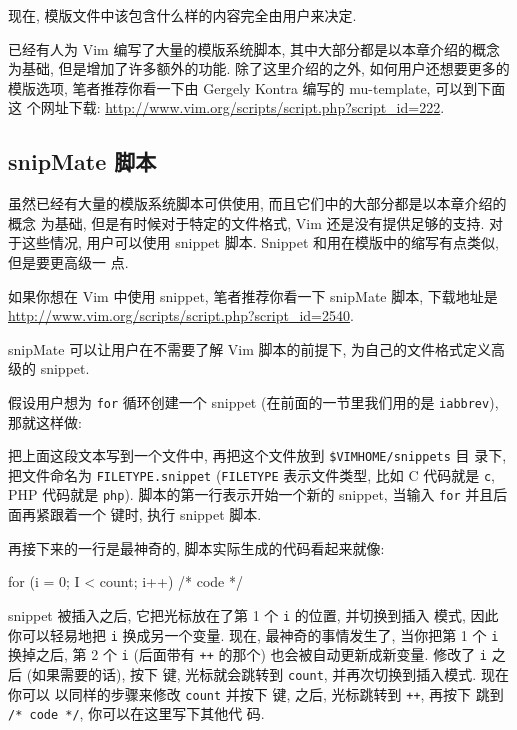 现在, 模版文件中该包含什么样的内容完全由用户来决定.

\begin{warning}
    已经有人为 Vim 编写了大量的模版系统脚本, 其中大部分都是以本章介绍的概念为基础,
    但是增加了许多额外的功能. 除了这里介绍的之外, 如何用户还想要更多的模版选项,
    笔者推荐你看一下由 Gergely Kontra 编写的 mu-template, 可以到下面这
    个网址下载: \url{http://www.vim.org/scripts/script.php?script_id=222}.
\end{warning}

\subsection{snipMate 脚本}
\label{subsec:snippets_with_the_snipmate_script}

虽然已经有大量的模版系统脚本可供使用, 而且它们中的大部分都是以本章介绍的概念
为基础, 但是有时候对于特定的文件格式, Vim 还是没有提供足够的支持. 对于这些情况,
用户可以使用 snippet 脚本. Snippet 和用在模版中的缩写有点类似, 但是要更高级一
点.

如果你想在 Vim 中使用 snippet, 笔者推荐你看一下 snipMate 脚本, 下载地址是
\url{http://www.vim.org/scripts/script.php?script_id=2540}.

snipMate 可以让用户在不需要了解 Vim 脚本的前提下, 为自己的文件格式定义高级的
snippet.

假设用户想为 \texttt{for} 循环创建一个 snippet (在前面的一节里我们用的是 
\texttt{iabbrev}),  那就这样做:
把上面这段文本写到一个文件中, 再把这个文件放到 \texttt{\$VIMHOME/snippets} 目
录下, 把文件命名为 \texttt{FILETYPE.snippet} (\texttt{FILETYPE} 表示文件类型,
比如 C 代码就是 \texttt{c}, PHP 代码就是 \texttt{php}).
脚本的第一行表示开始一个新的 snippet, 当输入 \texttt{for} 并且后面再紧跟着一个
 键时, 执行 snippet 脚本.

再接下来的一行是最神奇的, 脚本实际生成的代码看起来就像:
\begin{vimcode}
    for (i = 0; I < count; i++) {
        /* code */
    }
\end{vimcode}

snippet 被插入之后, 它把光标放在了第 1 个 \texttt{i} 的位置, 并切换到插入
模式, 因此你可以轻易地把 \texttt{i} 换成另一个变量. 现在, 最神奇的事情发生了,
当你把第 1 个 \texttt{i} 换掉之后, 第 2 个 \texttt{i} (后面带有 \texttt{++}
的那个) 也会被自动更新成新变量. 修改了 \texttt{i} 之后 (如果需要的话), 按下
 键, 光标就会跳转到 \texttt{count}, 并再次切换到插入模式. 现在你可以
以同样的步骤来修改 \texttt{count} 并按下  键, 之后, 光标跳转到
\texttt{++}, 再按下  跳到 \texttt{/* code */}, 你可以在这里写下其他代
码.

